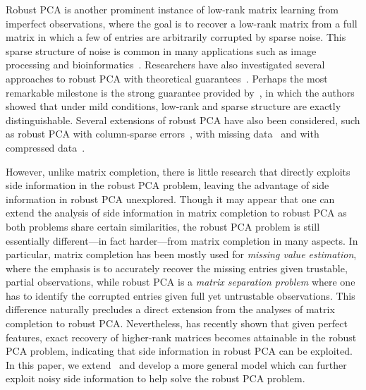 \documentclass[twoside,11pt]{article}
\begin{document}

Robust PCA is another prominent instance of low-rank matrix learning
from imperfect observations,
where the goal is to recover a low-rank matrix
from a full matrix in which a few of entries are arbitrarily corrupted by sparse noise.
This sparse structure of noise is common in many applications such as
image processing and bioinformatics~\citep{Wright09a}.
Researchers have also investigated several approaches to robust PCA with
theoretical guarantees~\citep{VC11a, Candes11a}.
Perhaps the most remarkable milestone is the strong guarantee
provided by~\citet{Candes11a}, in which the authors showed that under mild conditions,
low-rank and sparse structure are exactly distinguishable.
Several extensions of robust PCA
have also been considered, such as robust PCA with column-sparse errors~\citep{Xu10a},
with missing data~\citep{Candes11a, Chen13a} and with compressed data~\citep{Ha15a}.

However, unlike matrix completion, there is little research that directly exploits
side information in the robust PCA problem, leaving the advantage of side information
in robust PCA unexplored.
Though it may appear that one can extend the analysis of side information in matrix completion
to robust PCA as both problems share certain similarities,
the robust PCA problem
is still essentially different---in fact harder---from matrix completion in many aspects.
In particular, matrix completion has been mostly used for {\it missing value estimation},
where the emphasis is to accurately recover the missing entries given trustable, partial
observations, while robust PCA is a {\it matrix separation problem} where
one has to identify the corrupted entries given full yet untrustable observations.
This difference naturally precludes a direct extension from the analyses of
matrix completion to robust PCA.  Nevertheless, \citet{Chiang16a}
has recently shown that given perfect features, exact recovery of higher-rank matrices becomes
attainable in the robust PCA problem, indicating that side information in robust PCA
can be exploited.
In this paper, we extend~\citet{Chiang16a} and develop a more general model which can
further exploit noisy side information to help solve the robust PCA problem.
\end{document}
